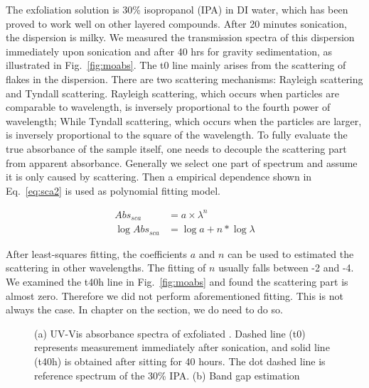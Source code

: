 The exfoliation solution is 30\% isopropanol (IPA) in DI water, which has been proved to work well on other layered compounds.\cite{Halim2013} After 20 minutes sonication, the dispersion is milky. We measured the transmission spectra of this dispersion immediately upon sonication and after 40 hrs for gravity sedimentation, as illustrated in Fig.~\ref{fig:moabs}. The t0 line mainly arises from the scattering of flakes in the dispersion. There are two scattering mechanisms: Rayleigh scattering and Tyndall scattering. Rayleigh scattering, which occurs when particles are comparable to wavelength, is inversely proportional to the fourth power of wavelength; While Tyndall scattering, which occurs when the particles are larger, is inversely proportional to the square of the wavelength. To fully evaluate the true absorbance of the sample itself, one needs to decouple the scattering part from apparent absorbance. Generally we select one part of spectrum and assume it is only caused by scattering. Then a empirical dependence shown in Eq.~\ref{eq:sca2} is used as polynomial fitting model.

\begin{align}
Abs_{sca}  & = a\times \lambda^{n}  \label{eq:sca1}\\
\log{Abs_{sca}} & = \log{a} + n*\log{\lambda} \label{eq:sca2}
\end{align}

After least-squares fitting, the coefficients $a$ and $n$ can be used to estimated the scattering in other wavelengths. The fitting of $n$ usually falls between -2 and -4. We examined the t40h line in Fig.~\ref{fig:moabs} and found the scattering part is almost zero. Therefore we did not perform aforementioned fitting. This is not always the case. In chapter on the  section, we do need to do so.

\begin{figure}[htb]
\centering
{}\hspace{0.04\textwidth}
\caption[UV-Vis spectra of exfoliated ]{(a) UV-Vis absorbance spectra of exfoliated . Dashed line (t0) represents measurement immediately after sonication, and solid line (t40h) is obtained after sitting for 40 hours. The dot dashed line is reference spectrum of the 30\% IPA. (b) Band gap estimation}
\label{fig:mouv}
\end{figure}

